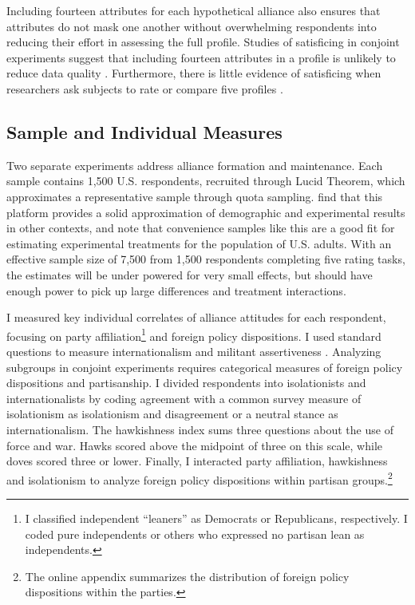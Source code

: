 \documentclass[12pt]{article}
\begin{document}
Including fourteen attributes for each hypothetical alliance also ensures that attributes do not mask one another without overwhelming respondents into reducing their effort in assessing the full profile.
Studies of satisficing in conjoint experiments suggest that including fourteen attributes in a profile is unlikely to reduce data quality \citep{Bansaketal2019}. 
Furthermore, there is little evidence of satisficing when researchers ask subjects to rate or compare five profiles \citep{Bansaketal2018}.



\subsection{Sample and Individual Measures}


Two separate experiments address alliance formation and maintenance. 
Each sample contains 1,500 U.S. respondents, recruited through Lucid Theorem, which approximates a representative sample through quota sampling.
\citet{CoppockMcClellan2019} find that this platform provides a solid approximation of demographic and experimental results in other contexts, and note that convenience samples like this are a good fit for estimating experimental treatments for the population of U.S. adults.
With an effective sample size of 7,500 from 1,500 respondents completing five rating tasks, the estimates will be under powered for very small effects, but should have enough power to pick up large differences and treatment interactions. 


I measured key individual correlates of alliance attitudes for each respondent, focusing on party affiliation\footnote{I classified independent ``leaners'' as Democrats or Republicans, respectively. I coded pure independents or others who expressed no partisan lean as independents.} and foreign policy dispositions. 
I used standard questions to measure internationalism and militant assertiveness \citep{KertzerBrutger2016}.
Analyzing subgroups in conjoint experiments requires categorical measures of foreign policy dispositions and partisanship.
I divided respondents into isolationists and internationalists by coding agreement with a common survey measure of isolationism as isolationism and disagreement or a neutral stance as internationalism. 
The hawkishness index sums three questions about the use of force and war. 
Hawks scored above the midpoint of three on this scale, while doves scored three or lower. 
Finally, I interacted party affiliation, hawkishness and isolationism to analyze foreign policy dispositions within partisan groups.\footnote{The online appendix summarizes the distribution of foreign policy dispositions within the parties.} 
\end{document}
